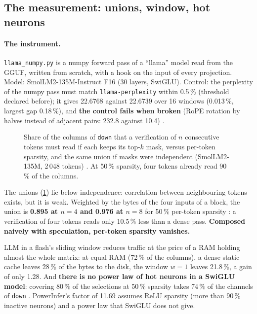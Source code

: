 \subsection{The measurement: unions, window, hot neurons}

\paragraph{The instrument.} \texttt{llama\_numpy.py} is a numpy forward pass of a \enquote{llama} model read from the GGUF, written from scratch, with a hook on the input of every projection. Model: SmolLM2-135M-Instruct F16 (30 layers, SwiGLU). Control: the perplexity of the numpy pass must match \texttt{llama-perplexity} within 0.5\,\% (threshold declared before); it gives 22.6768 against 22.6739 over 16 windows (0.013\,\%, largest gap 0.18\,\%), and \textbf{the control fails when broken} (RoPE rotation by halves instead of adjacent pairs: 232.8 against 10.4) \mes.

\begin{figure}[ht]
\centering
\GrapheUnions
\caption[The union of the masks of $n$ consecutive tokens]{Share of the columns of \texttt{down} that a verification of $n$ consecutive tokens must read if each keeps its top-$k$ mask, versus per-token sparsity, and the same union if masks were independent (SmolLM2-135M, 2\,048 tokens) \mes. At 50\,\% sparsity, four tokens already read 90\,\% of the columns.}
\label{fig:unions}
\end{figure}

The unions (\cref{fig:unions}) lie below independence: correlation between neighbouring tokens exists, but it is weak. Weighted by the bytes of the four inputs of a block, the union is \textbf{0.895 at $n = 4$ and 0.976 at $n = 8$} for 50\,\% per-token sparsity \calc: a verification of four tokens reads only 10.5\,\% less than a dense pass. \textbf{Composed naively with speculation, per-token sparsity vanishes.}

LLM in a flash's sliding window reduces traffic at the price of a RAM holding almost the whole matrix: at equal RAM (72\,\% of the columns), a dense static cache leaves 28\,\% of the bytes to the disk, the window $w = 1$ leaves 21.8\,\%, a gain of only 1.28. And \textbf{there is no power law of hot neurons in a SwiGLU model}: covering 80\,\% of the selections at 50\,\% sparsity takes 74\,\% of the channels of \texttt{down} \mes. PowerInfer's factor of 11.69 assumes ReLU sparsity (more than 90\,\% inactive neurons) and a power law that SwiGLU does not give.

